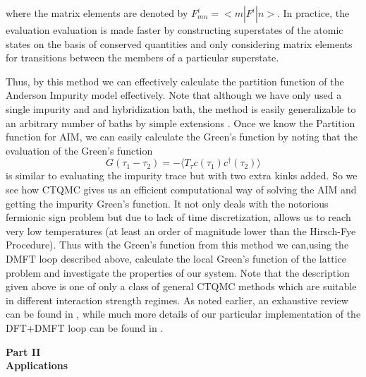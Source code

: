 \documentclass[10pt]{ruthesis}
\begin{document}
{where the matrix elements are denoted by $F^{i}_{mn}=<m|F^{i}|n>$. In practice, the evaluation evaluation is made faster by constructing superstates of the atomic states on the basis of conserved quantities and only considering matrix elements for transitions between the members of a particular  superstate.




Thus, by this method we can effectively calculate the partition function of the Anderson Impurity model effectively. Note that although we have only used a single impurity and and hybridization bath, the method is easily generalizable to an arbitrary number of baths by simple extensions \cite{hauleqmc}. Once we know the Partition function for AIM, we can easily calculate the Green's function by noting that the evaluation of the Green's function
\begin{equation}
G(\tau_{1}-\tau_{2})=-\langle T_{\tau} c(\tau_{1})c^{\dagger}(\tau_{2})\rangle
\end{equation}
 is similar to evaluating the impurity trace but with two extra kinks added. 
So we see how CTQMC gives us an efficient computational way of solving the AIM and getting the impurity Green's function. It not only deals with the notorious fermionic sign problem but due to lack of time discretization, allows us to reach very low temperatures (at least an order of magnitude lower than the Hirsch-Fye Procedure). Thus with the Green's function from this method we can,using the DMFT loop described above, calculate the local Green's function of the lattice problem and investigate the properties of our system. Note that the description given above is one of only a class of general CTQMC methods which are suitable in different interaction strength regimes. As noted earlier, an exhaustive review can be found in \cite{millisqmc}, while much more details of our particular implementation of the DFT+DMFT loop can be found in \cite{Chuck_prb}.


\clearpage

\begin{center}
\begin{huge}
\vspace*{4in}
\textbf{Part II\\ 
\vspace{0.3 in}
 Applications}
\end{huge}

\end{center}


}
\end{document}
